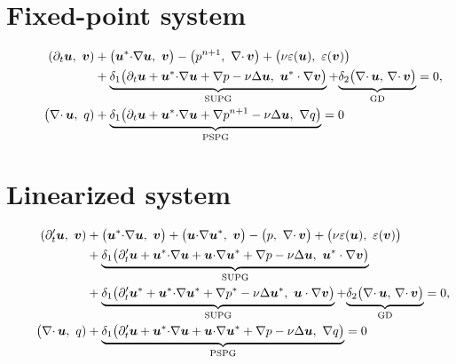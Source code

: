 \documentclass[review,onefignum,onetabnum]{siamart190516}
\begin{document}
\section{Fixed-point system}

\begin{equation}
  \begin{aligned}
    \left( \partial_t {\boldsymbol u} ,\  {\boldsymbol v} \right) 
    &+ \big( {\color{black}{\boldsymbol u}^*} {\cdot} \nabla {\boldsymbol u},\ {\boldsymbol v} \big)
    - \big( {\color{black}p^{n+1}},\ \nabla{\cdot\,} {\boldsymbol v} \big) + 
    \big( \nu \varepsilon({\boldsymbol u}),\ \varepsilon({\boldsymbol v}) \big) \\
    & 
    +  
    \underbrace{\delta_1 \big( \partial_t {\boldsymbol u} + {\color{black}{\boldsymbol u}^*} {\cdot} \nabla {\boldsymbol u} + \nabla p - \nu \Delta {\boldsymbol u},\ {\color{black}{\boldsymbol u}^*} \cdot \nabla {\boldsymbol v} \big)}_{\text{SUPG}}  +
    {\underbrace{\delta_2 \big(\nabla{\cdot\,} {\boldsymbol u}, \, \nabla{\cdot\,} {\boldsymbol v} \big)}_{\text{GD}}}
    =0, \\
    \hspace{2.2em} 
    \big( \nabla{\cdot\,} {\boldsymbol u},\ q)&
    + \underbrace{\delta_1 \big( \partial_t {\boldsymbol u} + {\color{black}{\boldsymbol u}^*} {\cdot} \nabla {\boldsymbol u} + {\color{black}\nabla p^{n+1}} - \nu \Delta {\boldsymbol u},\ \nabla q \big)}_{\text{PSPG}} = 0 
  \end{aligned}
\end{equation}

\section{Linearized system}

\begin{equation}
  \begin{aligned}
    \left( {\color{black}\partial_t'} {\boldsymbol u} ,\  {\boldsymbol v} \right) 
    &+ \big( {\boldsymbol u}^* {\cdot} \nabla {\boldsymbol u},\ {\boldsymbol v} \big)
    + {\color{black}\big( {\boldsymbol u} {\cdot} \nabla {\boldsymbol u}^*,\ {\boldsymbol v} \big)}
    - \big( p,\ \nabla{\cdot\,} {\boldsymbol v} \big) + 
    \big( \nu \varepsilon({\boldsymbol u}),\ \varepsilon({\boldsymbol v}) \big) \\
    & 
    +  
    \underbrace{\delta_1 \big( {\color{black}\partial_t'} {\boldsymbol u} + {\color{black}{\boldsymbol u}^*} {\cdot} \nabla {\boldsymbol u} +  {\color{black}{\boldsymbol u} {\cdot} \nabla {\boldsymbol u}^*} + \nabla p - \nu \Delta {\boldsymbol u},\ {\color{black}{\boldsymbol u}^*} \cdot \nabla {\boldsymbol v} \big)}_{\text{SUPG}} 
    \\
    & 
    +  
    \underbrace{{\color{black}\delta_1 \big(\partial_t' {\boldsymbol u}^* + {\boldsymbol u}^* {\cdot} \nabla {\boldsymbol u}^* + \nabla p^* - \nu \Delta {\boldsymbol u}^*,\ {\boldsymbol u} \cdot \nabla {\boldsymbol v} \big)}}_{\text{SUPG}}  +
    {\underbrace{\delta_2 \big(\nabla{\cdot\,} {\boldsymbol u}, \, \nabla{\cdot\,} {\boldsymbol v} \big)}_{\text{GD}}}
    =0, \\
    \hspace{2.2em} 
    \big( \nabla{\cdot\,} {\boldsymbol u},\ q)&
    + \underbrace{\delta_1 \big( {\color{black}\partial_t'} {\boldsymbol u} + {\color{black}{\boldsymbol u}^*} {\cdot} \nabla {\boldsymbol u} + {\color{black}{\boldsymbol u} {\cdot} \nabla {\boldsymbol u}^*} + \nabla p - \nu \Delta {\boldsymbol u},\ \nabla q \big)}_{\text{PSPG}} = 0 
  \end{aligned}
\end{equation}
\end{document}

